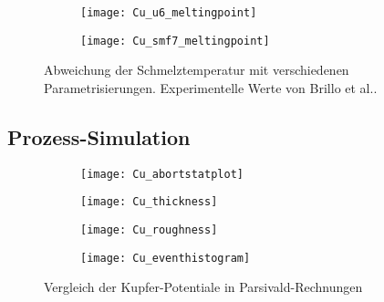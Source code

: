 \begin{figure}
  \captionsetup[subfigure]{singlelinecheck=false}
  \def\subfigwidth{7cm}
  \begin{subfigure}[t]{\subfigwidth}
    \texttt{[image: Cu\_u6\_meltingpoint]}
  \end{subfigure}
  \hfill
  \begin{subfigure}[t]{\subfigwidth}
    \texttt{[image: Cu\_smf7\_meltingpoint]}
  \end{subfigure}
  \caption[Abweichung der Schmelztemperaturen bei Kupfer-MD]{
    Abweichung der Schmelztemperatur mit verschiedenen Parametrisierungen.
    Experimentelle Werte von Brillo et al.\cite{brillo_density_2006}.
  }
  \label{fig:copperthermo}
\end{figure}

\subsection{Prozess-Simulation}
\label{coppersimulation}

\begin{figure}
  \captionsetup[subfigure]{singlelinecheck=false}
  \def\subfigwidth{0.49\textwidth}
  \begin{subfigure}[t]{\subfigwidth}
    \texttt{[image: Cu\_abortstatplot]}
    \label{fig:copperparsivald-a}
  \end{subfigure}
  \hfill
  \begin{subfigure}[t]{\subfigwidth}
    \texttt{[image: Cu\_thickness]}
    \label{fig:copperparsivald-b}
  \end{subfigure}
  \begin{subfigure}[t]{\subfigwidth}
    \texttt{[image: Cu\_roughness]}
    \label{fig:copperparsivald-c}
  \end{subfigure}
  \hfill
  \begin{subfigure}[t]{\subfigwidth}
    \texttt{[image: Cu\_eventhistogram]}
    \label{fig:copperparsivald-d}
  \end{subfigure}
  \caption{Vergleich der Kupfer-Potentiale in Parsivald-Rechnungen}
  \label{fig:copperparsivald}
\end{figure}

